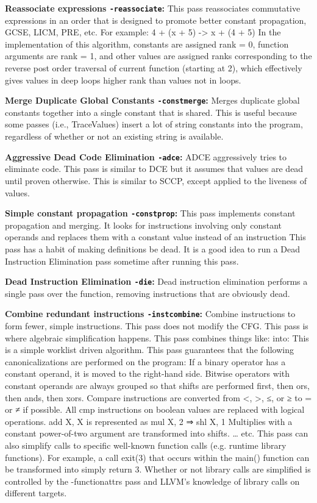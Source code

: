 \noindent\textbf{Reassociate expressions \texttt{-reassociate}:}
This pass reassociates commutative expressions in an order that is designed to promote better constant propagation, GCSE, LICM, PRE, etc.
For example: 4 + (x + 5) -> x + (4 + 5)
In the implementation of this algorithm, constants are assigned rank = 0, function arguments are rank = 1, and other values are assigned ranks corresponding to the reverse post order traversal of current function (starting at 2), which effectively gives values in deep loops higher rank than values not in loops.

\noindent\textbf{Merge Duplicate Global Constants \texttt{-constmerge}:}
Merges duplicate global constants together into a single constant that is shared. This is useful because some passes (i.e., TraceValues) insert a lot of string constants into the program, regardless of whether or not an existing string is available.

\noindent\textbf{Aggressive Dead Code Elimination \texttt{-adce}:}
ADCE aggressively tries to eliminate code.
This pass is similar to DCE but it assumes that values are dead until proven otherwise.
This is similar to SCCP, except applied to the liveness of values.

\noindent\textbf{Simple constant propagation \texttt{-constprop}:}
This pass implements constant propagation and merging.
It looks for instructions involving only constant operands and replaces them with a constant value instead of an instruction
This pass has a habit of making definitions be dead.
It is a good idea to run a Dead Instruction Elimination pass sometime after running this pass.

\noindent\textbf{Dead Instruction Elimination \texttt{-die}:}
Dead instruction elimination performs a single pass over the function, removing instructions that are obviously dead.

\noindent\textbf{Combine redundant instructions \texttt{-instcombine}:}
Combine instructions to form fewer, simple instructions.
This pass does not modify the CFG.
This pass is where algebraic simplification happens.
This pass combines things like:
into:
This is a simple worklist driven algorithm.
This pass guarantees that the following canonicalizations are performed on the program:
If a binary operator has a constant operand, it is moved to the right-hand side.
Bitwise operators with constant operands are always grouped so that shifts are performed first, then ors, then ands, then xors.
Compare instructions are converted from <, >, ≤, or ≥ to = or ≠ if possible.
All cmp instructions on boolean values are replaced with logical operations.
add X, X is represented as mul X, 2 ⇒ shl X, 1
Multiplies with a constant power-of-two argument are transformed into shifts.
… etc.
This pass can also simplify calls to specific well-known function calls (e.g. runtime library functions). For example, a call exit(3) that occurs within the main() function can be transformed into simply return 3. Whether or not library calls are simplified is controlled by the -functionattrs pass and LLVM’s knowledge of library calls on different targets.

